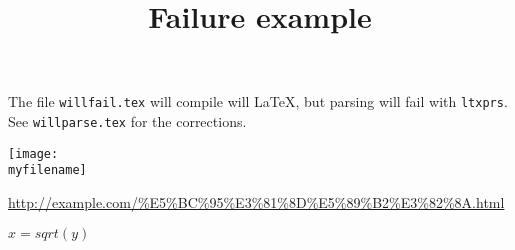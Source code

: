 \documentclass[french]{article}
\newcommand{\myfilename}{"$HOME/toto.png"}
\newcommand{\myurl}{\url{http://example.com/\%E5\%BC\%95\%E3\%81\%8D\%E5\%89\%B2\%E3\%82\%8A.html}}
\begin{document}
\title{Failure example}
The file \texttt{willfail.tex} will compile will \LaTeX, but parsing will fail with \texttt{ltxprs}.
See \texttt{willparse.tex} for the corrections. 

\texttt{[image: \\myfilename]}

\myurl




$ x= sqrt(y)$
\end{document}
